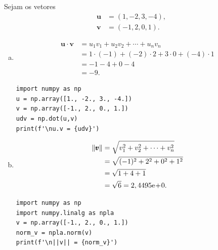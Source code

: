 \begin{ex}
  Sejam os vetores
  \begin{align}
    \pmb{u} &= (1, -2, 3, -4),\\
    \pmb{v} &= (-1, 2, 0, 1).
  \end{align}
  \begin{enumerate}[a)]
  \item
    \begin{align}
      \pmb{u}\cdot\pmb{v} &= u_1v_1 + u_2v_2 + \cdots + u_nv_n\\
                          &= 1\cdot(-1) + (-2)\cdot 2 + 3\cdot 0 + (-4)\cdot 1\\
                          &= -1 - 4 + 0 - 4\\
                          &= -9.
    \end{align}

\begin{lstlisting}
import numpy as np
u = np.array([1., -2., 3., -4.])
v = np.array([-1., 2., 0., 1.])
udv = np.dot(u,v)
print(f'\nu.v = {udv}')
\end{lstlisting}

  \item
    \begin{align}
      \|\pmb{v}\| &= \sqrt{v_1^2 + v_2^2 + \cdots + v_n^2}\\
                  &= \sqrt{(-1)^2 + 2^2 + 0^2 + 1^2}\\
                  &= \sqrt{1 + 4 + 1}\\
                  &= \sqrt{6} = 2,4495\mathrm{e}\!+\!0.
    \end{align}

\begin{lstlisting}
import numpy as np
import numpy.linalg as npla
v = np.array([-1., 2., 0., 1.])
norm_v = npla.norm(v)
print(f'\n||v|| = {norm_v}')
\end{lstlisting}
  \end{enumerate}
\end{ex}


